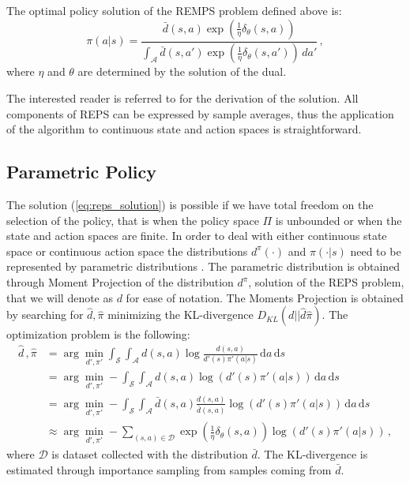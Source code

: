 \begin{theorem} The optimal policy solution of the REMPS problem defined above is:
\begin{equation}
	\pi(a | s) = \frac{\bar{d}(s,a) \exp(\frac{1}{\eta}\delta_\theta(s,a))}{\int_\mathcal{A}\bar{d}(s,a') \exp(\frac{1}{\eta}\delta_\theta(s,a')) \, da'} \, ,
	\label{eq:reps_solution}
\end{equation}
where $\eta$ and $\theta$ are determined by the solution of the dual.
\end{theorem}
The interested reader is referred to \citep{reps} for the derivation of the solution.
All components of REPS can be expressed by sample averages, thus the application of the algorithm to continuous state and action spaces is straightforward.

\subsection{Parametric Policy}
The solution (\ref{eq:reps_solution}) is possible if we have total freedom on the selection of the policy, that is when the policy space $\Pi$ is unbounded or when the state and action spaces are finite. In order to deal with either continuous state space or continuous action space the distributions $d^\pi(\cdot)$ and $\pi(\cdot | s)$ need to be represented by parametric distributions \citep{danielhierarchicalnodate}.
The parametric distribution is obtained through Moment Projection of the distribution $d^\pi$, solution of the REPS problem, that we will denote as $d$ for ease of notation. The Moments Projection is obtained by searching for $\hat{d}, \hat{\pi}$ minimizing the KL-divergence $D_{KL}(d || \hat{d}\hat{\pi})$. The optimization problem is the following:
\begin{align}
	 \hat{d} \, , \hat{\pi} &=  \arg \min_{d', \pi'} \int_{\mathcal{S}} \int_{\mathcal{A}} d(s,a) \log \frac{d(s,a)}{d'(s) \pi'(a | s)} \, \mathrm{d}a \, \mathrm{d}s \\
	 &=  \arg \min_{d', \pi'} -\int_{\mathcal{S}} \int_{\mathcal{A}} d(s,a) \log \left( d'(s)\pi'(a | s) \right) \, \mathrm{d}a \, \mathrm{d}s \\ 
	 &=  \arg \min_{d', \pi'} -\int_{\mathcal{S}} \int_{\mathcal{A}}\bar{d}(s,a) \frac{d(s,a)}{\bar{d}(s,a)} \log \left( d'(s)\pi'(a | s) \right) \, \mathrm{d}a \, \mathrm{d}s \\ 
	 &\approx \arg \min_{d', \pi'} -\sum_{(s,a)  \in \mathcal{D}} \exp\left(\frac{1}{\eta}\delta_\theta(s,a)\right) \log\left(d'(s)\pi'(a | s) \right) \, ,
\end{align}
where $\mathcal{D}$ is dataset collected with the distribution $\bar{d}$.
The KL-divergence is estimated through importance sampling from samples coming from $\bar{d}$.

